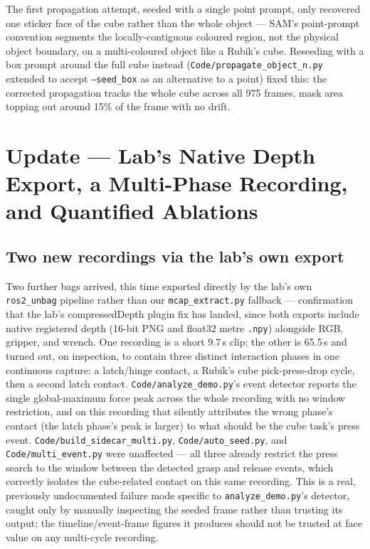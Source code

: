 \documentclass[11pt]{article}
\begin{document}
The first propagation attempt, seeded with a single point prompt, only
recovered one sticker face of the cube rather than the whole object ---
SAM's point-prompt convention segments the locally-contiguous coloured
region, not the physical object boundary, on a multi-coloured object like a
Rubik's cube. Reseeding with a box prompt around the full cube instead
(\texttt{Code/propagate\_object\_n.py} extended to accept
\texttt{--seed\_box} as an alternative to a point) fixed this: the
corrected propagation tracks the whole cube across all 975 frames, mask
area topping out around 15\% of the frame with no drift.

\section{Update --- Lab's Native Depth Export, a Multi-Phase Recording, and Quantified Ablations}

\subsection{Two new recordings via the lab's own export}

Two further bags arrived, this time exported directly by the lab's own
\texttt{ros2\_unbag} pipeline rather than our \texttt{mcap\_extract.py}
fallback --- confirmation that the lab's compressedDepth plugin fix has
landed, since both exports include native registered depth (16-bit PNG and
float32 metre \texttt{.npy}) alongside RGB, gripper, and wrench. One
recording is a short 9.7\,s clip; the other is 65.5\,s and turned out, on
inspection, to contain three distinct interaction phases in one continuous
capture: a latch/hinge contact, a Rubik's cube pick-press-drop cycle, then
a second latch contact. \texttt{Code/analyze\_demo.py}'s event detector reports the single
global-maximum force peak across the whole recording with no window
restriction, and on this recording that silently attributes the wrong
phase's contact (the latch phase's peak is larger) to what should be the
cube task's press event. \texttt{Code/build\_sidecar\_multi.py},
\texttt{Code/auto\_seed.py}, and \texttt{Code/multi\_event.py} were
unaffected --- all three already restrict the press search to the window
between the detected grasp and release events, which correctly isolates
the cube-related contact on this same recording. This is a real,
previously undocumented failure mode specific to
\texttt{analyze\_demo.py}'s detector, caught only by manually inspecting
the seeded frame rather than trusting its output; the timeline/event-frame
figures it produces should not be trusted at face value on any
multi-cycle recording.
\end{document}
